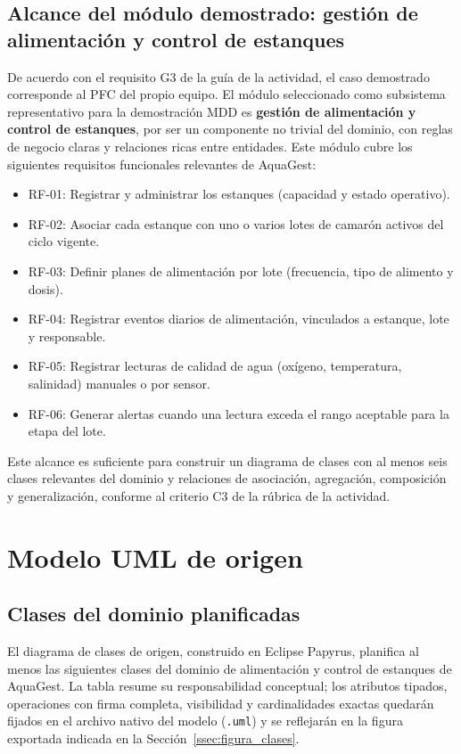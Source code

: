 \documentclass[11pt,a4paper]{article}
\begin{document}
\subsection{Alcance del módulo demostrado: gestión de alimentación y control de estanques}
De acuerdo con el requisito G3 de la guía de la actividad, el caso demostrado corresponde al PFC del
propio equipo. El módulo seleccionado como subsistema representativo para la demostración MDD es
\textbf{gestión de alimentación y control de estanques}, por ser un componente no trivial del dominio,
con reglas de negocio claras y relaciones ricas entre entidades. Este módulo cubre los siguientes
requisitos funcionales relevantes de AquaGest:
\begin{itemize}[nosep]
  \item RF-01: Registrar y administrar los estanques (capacidad y estado operativo).
  \item RF-02: Asociar cada estanque con uno o varios lotes de camarón activos del ciclo vigente.
  \item RF-03: Definir planes de alimentación por lote (frecuencia, tipo de alimento y dosis).
  \item RF-04: Registrar eventos diarios de alimentación, vinculados a estanque, lote y responsable.
  \item RF-05: Registrar lecturas de calidad de agua (oxígeno, temperatura, salinidad) manuales o por sensor.
  \item RF-06: Generar alertas cuando una lectura exceda el rango aceptable para la etapa del lote.
\end{itemize}
Este alcance es suficiente para construir un diagrama de clases con al menos seis clases relevantes del
dominio y relaciones de asociación, agregación, composición y generalización, conforme al criterio
C3 de la rúbrica de la actividad.

\section{Modelo UML de origen}
\label{sec:modelo_uml}

\subsection{Clases del dominio planificadas}
El diagrama de clases de origen, construido en Eclipse Papyrus, planifica al menos las siguientes
clases del dominio de alimentación y control de estanques de AquaGest. La tabla resume su
responsabilidad conceptual; los atributos tipados, operaciones con firma completa, visibilidad y
cardinalidades exactas quedarán fijados en el archivo nativo del modelo (\texttt{.uml}) y se
reflejarán en la figura exportada indicada en la Sección~\ref{ssec:figura_clases}.
\end{document}
